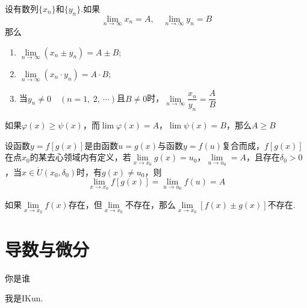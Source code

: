 \documentclass[lang=cn,10pt]{elegantbook}
\begin{document}
\begin{theorem}
	设有数列\( \{x_{n}\} \)和\( \{y_{n}\} \).如果
	\[ \lim\limits_{n \to \infty}x_{n} = A,\quad \lim\limits_{n \to \infty}y_{n} = B \]
	那么
	\begin{enumerate}
		\item \( \lim\limits_{n \to \infty}(x_{n} \pm y_{n}) = A \pm B \);
		\item \( \lim\limits_{n \to \infty}(x_{n} \cdot y_{n}) = A \cdot B \);
		\item 当\( y_{n} \neq 0\quad(n =1,\ 2,\ \cdots) \)且\( B \neq 0 \)时，\( \lim\limits_{n \to \infty}\dfrac{x_{n}}{y_{n}} = \dfrac{A}{B} \)
	\end{enumerate}
\end{theorem}

\begin{theorem}
	如果\( \varphi (x) \geqslant \psi (x) \)，而\( \lim \varphi (x) = A \)，\( \lim \psi (x) = B \)，那么\( A \geqslant B \)
\end{theorem}

\begin{theorem}[复合函数的极限运算法则]
	设函数\( y = f[g(x)] \)是由函数\( u = g(x) \)与函数\( y = f(u) \)复合而成，\( f[g(x)] \)在点\( x_{0} \)的某去心领域内有定义，若\( \lim\limits_{x \to x_{0}}g(x) = u_{0} \)，\( \lim\limits_{u \to u_{0}} = A \)，且存在\( \delta_{0} > 0 \)，当\( x \in \mathring{U}(x_{0}, \delta_{0}) \)时，有\( g(x) \neq u_{0} \)，则
	\[ \lim\limits_{x \to x_{0}}f[g(x)] = \lim\limits_{u \to u_{0}}f(u) = A \]
\end{theorem}

\begin{theorem}
	如果\( \lim\limits_{x \to x_{0}}f(x) \)存在，但\( \lim\limits_{x \to x_{0}} \)不存在，那么\( \lim\limits_{x \to x_{0}}[f(x) \pm g(x)] \)不存在.
\end{theorem}






\chapter{导数与微分}

\begin{problemset}[错题集]
	\item 你是谁\adftripleflourishright
\end{problemset}

\begin{conclusion}
	我是IKun.
\end{conclusion}
\end{document}
